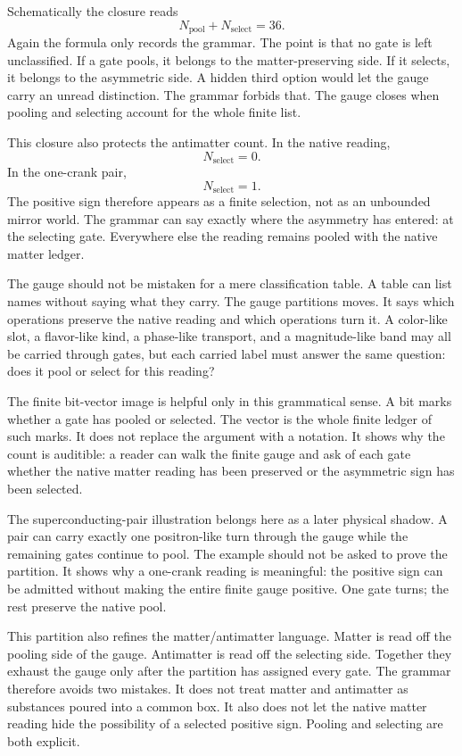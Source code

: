 Schematically the closure reads
\[
  N_{\mathrm{pool}} + N_{\mathrm{select}} = 36.
\]
Again the formula only records the grammar. The point is that no gate is
left unclassified. If a gate pools, it belongs to the matter-preserving side.
If it selects, it belongs to the asymmetric side. A hidden third option would
let the gauge carry an unread distinction. The grammar forbids that. The
gauge closes when pooling and selecting account for the whole finite list.

This closure also protects the antimatter count. In the native reading,
\[
  N_{\mathrm{select}} = 0.
\]
In the one-crank pair,
\[
  N_{\mathrm{select}} = 1.
\]
The positive sign therefore appears as a finite selection, not as an
unbounded mirror world. The grammar can say exactly where the asymmetry has
entered: at the selecting gate. Everywhere else the reading remains pooled
with the native matter ledger.

The gauge should not be mistaken for a mere classification table. A table
can list names without saying what they carry. The gauge partitions moves.
It says which operations preserve the native reading and which operations
turn it. A color-like slot, a flavor-like kind, a phase-like transport, and
a magnitude-like band may all be carried through gates, but each carried
label must answer the same question: does it pool or select for this
reading?

The finite bit-vector image is helpful only in this grammatical sense. A bit
marks whether a gate has pooled or selected. The vector is the whole finite
ledger of such marks. It does not replace the argument with a notation. It
shows why the count is auditible: a reader can walk the finite gauge and ask
of each gate whether the native matter reading has been preserved or the
asymmetric sign has been selected.

The superconducting-pair illustration belongs here as a later physical
shadow. A pair can carry exactly one positron-like turn through the gauge
while the remaining gates continue to pool. The example should not be asked
to prove the partition. It shows why a one-crank reading is meaningful: the
positive sign can be admitted without making the entire finite gauge
positive. One gate turns; the rest preserve the native pool.

This partition also refines the matter/antimatter language. Matter is read
off the pooling side of the gauge. Antimatter is read off the selecting side.
Together they exhaust the gauge only after the partition has assigned every
gate. The grammar therefore avoids two mistakes. It does not treat matter
and antimatter as substances poured into a common box. It also does not let
the native matter reading hide the possibility of a selected positive sign.
Pooling and selecting are both explicit.

